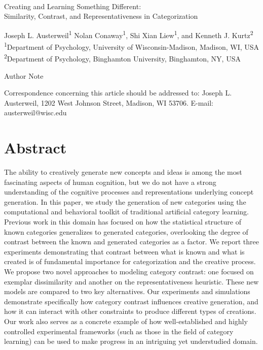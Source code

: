 \documentclass[12pt]{article}
\newcommand\jlanote[1]{\todo[inline, backgroundcolor = lime]{\textbf{JLA}: #1}}
\newcommand\sxlnote[1]{\todo[inline, backgroundcolor = cyan]{\textbf{SXL}: #1}}
\begin{document}
\begin{center}
\hfill
\\[1in]

Creating and Learning Something Different: \\
Similarity, Contrast, and Representativeness in Categorization


\vfill
Joseph L. Austerweil\textsuperscript{1}
Nolan Conaway\textsuperscript{1}, 
Shi Xian Liew\textsuperscript{1},
and Kenneth J. Kurtz\textsuperscript{2}
\\[\baselineskip]
\textsuperscript{1}Department of Psychology, University of Wisconsin-Madison, Madison, WI, USA
\textsuperscript{2}Department of Psychology, Binghamton University, Binghamton, NY, USA
\\[1in]

\vfill

Author Note

Correspondence concerning this article should be addressed to: 
Joseph L. Austerweil, 1202 West Johnson Street, Madison, WI 53706.
E-mail: austerweil@wisc.edu

\end{center}
\clearpage


\doublespacing
\section*{Abstract}
\jlanote{need to update} 
\sxlnote{updated} 
%
The ability to creatively generate new concepts and ideas is among the most
fascinating aspects of human cognition, but we do not have a strong
understanding of the cognitive processes and representations underlying concept
generation. In this paper, we study the generation of new categories using the
computational and behavioral toolkit of traditional artificial category
learning. Previous work in this domain has focused on how the statistical
structure of known categories generalizes to generated categories, overlooking
the degree of contrast between the known and generated categories as a factor.
We report three experiments demonstrating that contrast between what is known
and what is created is of fundamental importance for categorization and the
creative process. We propose two novel approaches to modeling category contrast:
one focused on exemplar dissimilarity and another on the representativeness
heuristic. These new models are compared to two key alternatives. Our
experiments and simulations demonstrate specifically how category contrast
influences creative generation, and how it can interact with other constraints
to produce different types of creations. Our work also serves as a concrete
example of how well-established and highly controlled experimental frameworks
(such as those in the field of category learning) can be used to make progress
in an intriguing yet understudied domain.
\end{document}
